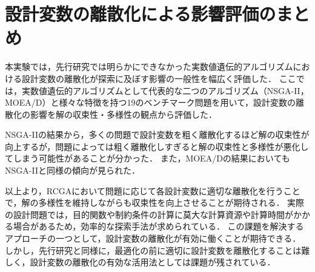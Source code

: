 \documentclass[../main/main]{subfiles}
\begin{document}
\section{設計変数の離散化による影響評価のまとめ}
\quad 本実験では，先行研究では明らかにできなかった実数値遺伝的アルゴリズムにおける設計変数の離散化が探索に及ぼす影響の一般性を幅広く評価した．
ここでは，実数値遺伝的アルゴリズムとして代表的な二つのアルゴリズム（NSGA-II，MOEA/D）と様々な特徴を持つ19のベンチマーク問題を用いて，設計変数の離散化の影響を解の収束性・多様性の観点から評価した．

NSGA-IIの結果から，多くの問題で設計変数を粗く離散化するほど解の収束性が向上するが，問題によっては粗く離散化しすぎると解の収束性と多様性が悪化してしまう可能性があることが分かった．
また，MOEA/Dの結果においてもNSGA-IIと同様の傾向が見られた．

以上より，RCGAにおいて問題に応じて各設計変数に適切な離散化を行うことで，解の多様性を維持しながらも収束性を向上させることが期待される．
実際の設計問題では，目的関数や制約条件の計算に莫大な計算資源や計算時間がかかる場合があるため，効率的な探索手法が求められている．
この課題を解決するアプローチの一つとして，設計変数の離散化が有効に働くことが期待できる．
しかし，先行研究と同様に，最適化の前に適切に設計変数を離散化することは難しく，設計変数の離散化の有効な活用法としては課題が残されている．
\end{document}
